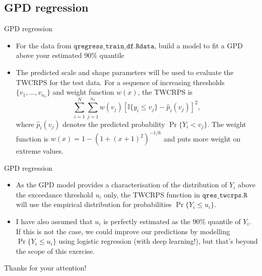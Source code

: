 \documentclass{beamer}
\begin{document}
\subsection{GPD regression}
\begin{frame}{GPD regression}
\begin{itemize}
\item For the data from $\texttt{qregress\_train\_df.Rdata}$, build a model to fit a GPD above your estimated $90\%$ quantile
\item The predicted scale and shape parameters will be used to evaluate the TWCRPS for the test data. For a sequence of increasing thresholds $\{v_1,\dots,v_{n_v}\}$ and weight function $w(x)$, the TWCRPS is 
\[
\sum_{i=1}^N\sum^{n_v}_{j=1}w(v_j)[\mathbb{I}\{y_i\leq v_j\}-\hat{p}_i(v_j)]^2,
\]
where $\hat{p}_i(v_j)$ denotes the predicted probability $\Pr\{Y_i < v_j\}$. The weight function is $w(x)=1-(1+(x+1)^2)^{-1/6}$ and puts more weight on extreme values.
\end{itemize}
\end{frame}
\begin{frame}{GPD regression}
\begin{itemize}
\item As the GPD model provides a characterisation of the distribution of $Y_i$ above the exceedance threshold $u_i$ only, the TWCRPS function in $\texttt{qres\_twcrps.R}$ will use the empirical distribution for probabilities $\Pr\{Y_i \leq u_i\}$.
\item I have also assumed that $u_i$ is perfectly estimated as the $90\%$ quantile of $Y_i$. If this is not the case, we could improve our predictions by modelling $\Pr\{Y_i \leq u_i\}$ using logistic regression (with deep learning!), but that's beyond the scope of this exercise. 
\end{itemize}
\end{frame}
\begin{frame}
\begin{center}
\Huge Thanks for your attention!
\end{center}
\end{frame}
\end{document}
